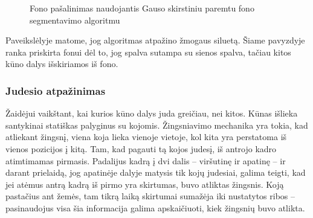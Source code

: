 \documentclass{VUMIFPSbakalaurinis}
\begin{document}
\begin{figure}[H]
    \centering
    \qquad
    \caption{Fono pašalinimas naudojantis Gauso skirstiniu paremtu fono segmentavimo algoritmu}
    \label{fig:example}
\end{figure}


Paveikslėlyje matome, jog algoritmas atpažino žmogaus siluetą. Šiame pavyzdyje ranka priskirta fonui dėl to, jog spalva sutampa su sienos spalva, tačiau kitos kūno dalys išskiriamos iš fono.

\subsubsection{Judesio atpažinimas}\label{section:movement}

Žaidėjui vaikštant, kai kurios kūno dalys juda greičiau, nei kitos. Kūnas išlieka santykinai statiškas palyginus su kojomis. Žingsniavimo mechanika yra tokia, kad atliekant žingsnį, viena koja lieka vienoje vietoje, kol kita yra perstatoma iš vienos pozicijos į kitą. Tam, kad pagauti tą kojos judesį, iš antrojo kadro atimtimamas pirmasis. Padalijus kadrą į dvi dalis – viršutinę ir apatinę – ir darant prielaidą, jog apatinėje dalyje matysis tik kojų judesiai, galima teigti, kad jei atėmus antrą kadrą iš pirmo yra skirtumas, buvo atliktas žingsnis. Koją pastačius ant žemės, tam tikrą laiką skirtumai sumažėja iki nustatytos ribos – pasinaudojus visa šia informacija galima apskaičiuoti, kiek žingsnių buvo atlikta. 
\end{document}
